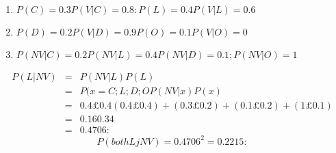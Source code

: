 \documentclass[a4paper,12pt]{article}
\begin{document}
\begin{enumerate}
\begin{enumerate}
    \item $P(C) = 0.3 P(V |C) = 0.8: P(L) = 0.4 P(V | L) = 0.6$
    \item $P(D) = 0.2 P(V |D) = 0.9 P(O) = 0.1 P(V |O) = 0$
    \item $P(NV |C) = 0.2 P(NV |L) = 0.4 P(NV |D) = 0.1; P(NV |O) = 1$
\end{enumerate}
\begin{eqnarray*}
P(L|NV ) &=& P(NV |L)P(L)\\ 
&=&
P(x=C;L;D;OP(NV |x)P(x)\\
&=& 0.4£0.4
(0.4£0.4)+(0.3£0.2)+(0.1£0.2)+(1£0.1)\\ &=& 0.16
0.34 \\ &=& 0.4706:
\end{eqnarray*}
\[P(both LjNV ) = 0.4706^2 = 0.2215:\]

\end{enumerate}
\end{document}
